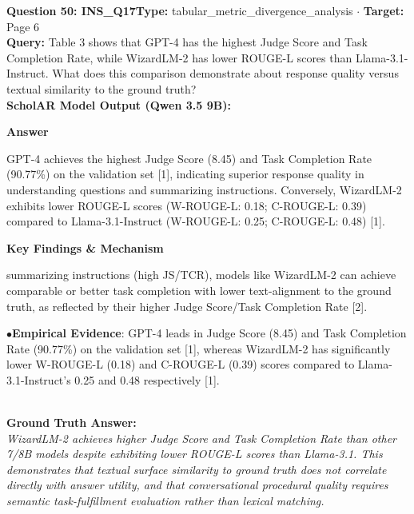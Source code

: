 \documentclass[10pt,a4paper]{article}
\begin{document}
\begin{tcolorbox}[questionbox]
{\noindent\bfseries\large\color{navy} Question 50: INS\_Q17}\hfill {\footnotesize\color{darkteal}\textbf{Type:} tabular\_metric\_divergence\_analysis $\cdot$ \textbf{Target:} Page 6}\\[4pt]
{\noindent\bfseries\color{accentblue} Query: } Table 3 shows that GPT-4 has the highest Judge Score and Task Completion Rate, while WizardLM-2 has lower ROUGE-L scores than Llama-3.1-Instruct. What does this comparison demonstrate about response quality versus textual similarity to the ground truth?\\[6pt]
{\noindent\bfseries\color{navy} ScholAR Model Output (Qwen 3.5 9B):}\\[2pt]
{\small \noindent \textbf{Answer}\par\vspace{3pt}GPT-4 achieves the highest Judge Score (8.45) and Task Completion Rate (90.77\%) on the validation set [1], indicating superior response quality in understanding questions and summarizing instructions. Conversely, WizardLM-2 exhibits lower ROUGE-L scores (W-ROUGE-L: 0.18; C-ROUGE-L: 0.39) compared to Llama-3.1-Instruct (W-ROUGE-L: 0.25; C-ROUGE-L: 0.48) [1].\par\vspace{3pt}\noindent \textbf{Key Findings \& Mechanism}\par\vspace{3pt}summarizing instructions (high JS/TCR), models like WizardLM-2 can achieve comparable or better task completion with lower text-alignment to the ground truth, as reflected by their higher Judge Score/Task Completion Rate [2].\par\vspace{3pt}\noindent\hspace*{8pt}$\bullet$\hspace*{4pt}\textbf{Empirical Evidence}: GPT-4 leads in Judge Score (8.45) and Task Completion Rate (90.77\%) on the validation set [1], whereas WizardLM-2 has significantly lower W-ROUGE-L (0.18) and C-ROUGE-L (0.39) scores compared to Llama-3.1-Instruct's 0.25 and 0.48 respectively [1].}\\[6pt]
{\noindent\bfseries\color{darkteal} Ground Truth Answer:}\\[2pt]
{\small\itshape WizardLM-2 achieves higher Judge Score and Task Completion Rate than other 7/8B models despite exhibiting lower ROUGE-L scores than Llama-3.1. This demonstrates that textual surface similarity to ground truth does not correlate directly with answer utility, and that conversational procedural quality requires semantic task-fulfillment evaluation rather than lexical matching.}\\[4pt]

\end{tcolorbox}
\end{document}
